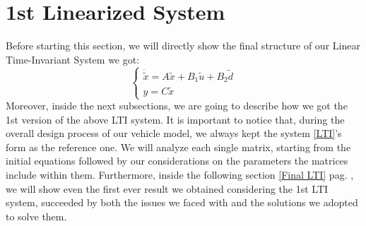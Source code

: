 \section{1st Linearized System} \label{1stLinSyst}
	Before starting this section, we will directly show the final structure of our Linear Time-Invariant System we got:
		\begin{equation} \label{LTI}
			\begin{cases}
				\dot{\tilde{x}} = A \tilde{x} + B_{1}\tilde{u} + B_{2}\tilde{d}\\
				y = C\tilde{x}
			\end{cases}
		\end{equation}
	Moreover, inside the next subsections, we are going to describe how we got the 1st version of the above LTI system. It is important to notice that, during the overall design process of our vehicle model, we always kept the system \ref{LTI}'s form as the reference one.
	We will analyze each single matrix, starting from the initial equations followed by our considerations on the parameters the matrices include within them. Furthermore, inside the following section \ref{Final LTI} pag. \pageref{Final LTI}, we will show even the first ever result we obtained considering the 1st LTI system, succeeded by both the issues we faced with and the solutions we adopted to solve them.
